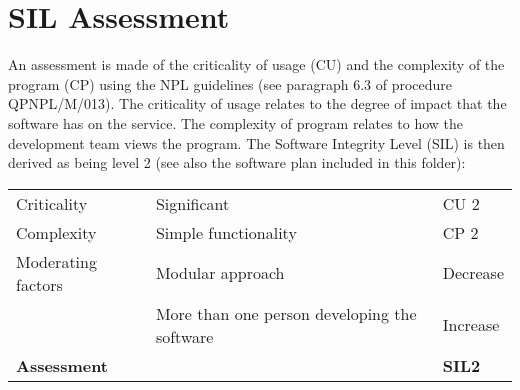 \section{SIL Assessment}\label{SIL-assessment}
An assessment is made of the criticality of usage (CU) and the complexity of the program (CP) using the NPL guidelines (see paragraph 6.3 of procedure QPNPL/M/013). The criticality of usage relates to the degree of impact that the software has on the service. The complexity of program relates to how the development team views the program. The Software Integrity Level (SIL) is then derived as being level 2 (see also the software plan included in this folder): 

\begin{tabular}{lll}
\toprule
Criticality         & Significant              & CU 2  \\
Complexity          & Simple functionality     & CP 2 \\
Moderating factors  & Modular approach         & Decrease \\
                    & More than one person developing the software & Increase \\ \midrule
\textbf{Assessment} &                                              & \textbf{SIL2}  \\ \bottomrule
\end{tabular}